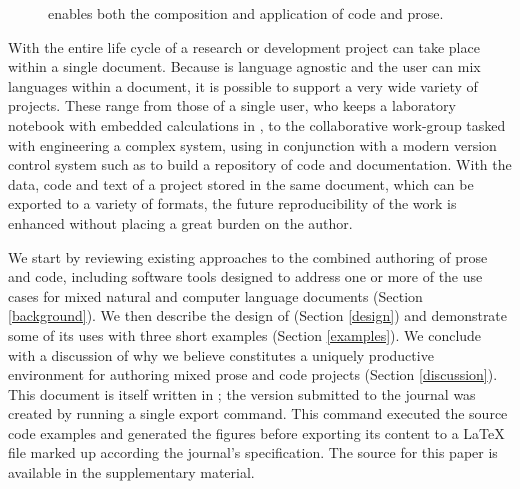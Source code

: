 \documentclass[article,shortnames]{jss}
\begin{document}
\begin{figure}[t!]
    \caption{ enables both the composition and
      application of code and prose.}
    \label{fig:overview}
  \end{figure}

With  the entire life cycle of a research or development
project can take place within a single document.  Because  is
language agnostic and the user can mix languages within a document, it
is possible to support a very wide variety of projects.  These range
from those of a single user, who keeps a laboratory notebook
with embedded calculations in , to the collaborative
work-group tasked with engineering a complex system, using
 in conjunction with a modern version control system such as
 to build a repository of code and documentation.  With the
data, code and text of a project stored in the same document, which can
be exported to a variety of formats, the future reproducibility of the
work is enhanced without placing a great burden on the
author.

We start by reviewing existing approaches to the combined authoring of
prose and code, including software tools designed to address one or
more of the use cases for mixed natural and computer language
documents (Section \ref{background}).  We then describe the design of
 (Section \ref{design}) and demonstrate some of its uses with
three short examples (Section \ref{examples}).  We conclude with a
discussion of why we believe  constitutes a uniquely
productive environment for authoring mixed prose and code projects
(Section \ref{discussion}).  This document is itself written in
; the version submitted to the journal was created by running
a single export command.  This command executed the source code
examples and generated the figures before exporting its content to a
\LaTeX{} file marked up according the journal's specification. The
 source for this paper is available in the supplementary material.
\end{document}
